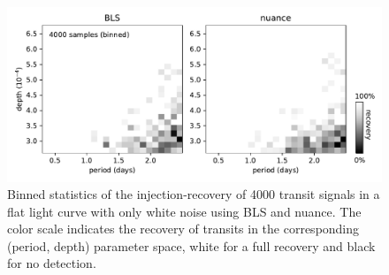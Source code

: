 \documentclass[modern,linenumbers]{aastex631}
\newcommand{\nuancecode}{\textsf{nuance}}
\begin{document}
\begin{figure}[H]
    \begin{centering}
        \includegraphics[width=\linewidth]{../workflows/control_test_bls/figures/control_test.pdf}
        \caption{Binned statistics of the injection-recovery of 4000 transit signals in a flat light curve with only white noise using \textsf{BLS} and \nuancecode{}. The color scale indicates the recovery of transits in the corresponding (period, depth) parameter space, white for a full recovery and black for no detection.}
        \label{fig:control}
    \end{centering}
\end{figure}



\newpage
\end{document}
